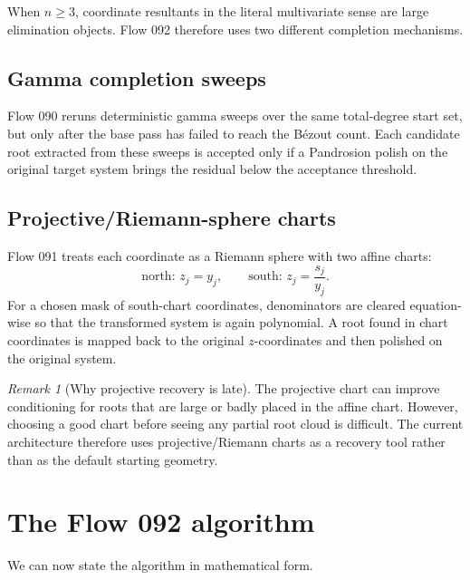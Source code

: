 \documentclass[11pt,a4paper]{article}
\theoremstyle{definition}
\theoremstyle{plain}
\theoremstyle{remark}
\newtheorem{remark}[definition]{Remark}
\begin{document}
When \(n\ge3\), coordinate resultants in the literal multivariate sense are
large elimination objects.  Flow 092 therefore uses two different completion
mechanisms.

\subsection{Gamma completion sweeps}

Flow 090 reruns deterministic gamma sweeps over the same total-degree start
set, but only after the base pass has failed to reach the B\'ezout count.  Each
candidate root extracted from these sweeps is accepted only if a Pandrosion
polish on the original target system brings the residual below the acceptance
threshold.

\subsection{Projective/Riemann-sphere charts}

Flow 091 treats each coordinate as a Riemann sphere with two affine charts:
\[
  \text{north: } z_j=y_j,
  \qquad
  \text{south: } z_j=\frac{s_j}{y_j}.
\]
For a chosen mask of south-chart coordinates, denominators are cleared
equation-wise so that the transformed system is again polynomial.  A root found
in chart coordinates is mapped back to the original \(z\)-coordinates and then
polished on the original system.

\begin{remark}[Why projective recovery is late]
The projective chart can improve conditioning for roots that are large or badly
placed in the affine chart.  However, choosing a good chart before seeing any
partial root cloud is difficult.  The current architecture therefore uses
projective/Riemann charts as a recovery tool rather than as the default
starting geometry.
\end{remark}

\section{The Flow 092 algorithm}

We can now state the algorithm in mathematical form.
\end{document}
